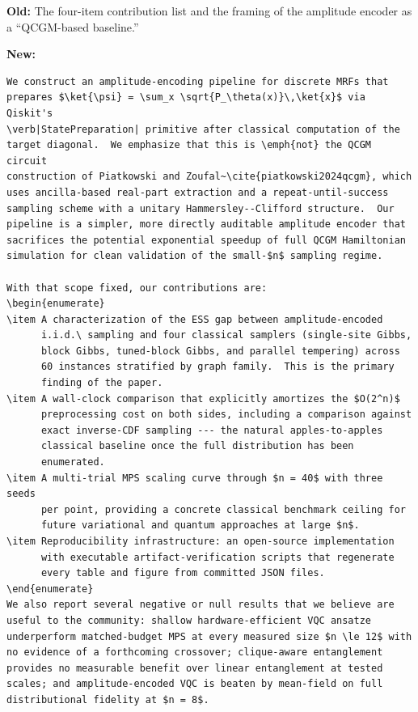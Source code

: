 \textbf{Old:} The four-item contribution list and the framing of the
amplitude encoder as a ``QCGM-based baseline.''

\noindent\textbf{New:}

\begin{verbatim}
We construct an amplitude-encoding pipeline for discrete MRFs that
prepares $\ket{\psi} = \sum_x \sqrt{P_\theta(x)}\,\ket{x}$ via Qiskit's
\verb|StatePreparation| primitive after classical computation of the
target diagonal.  We emphasize that this is \emph{not} the QCGM circuit
construction of Piatkowski and Zoufal~\cite{piatkowski2024qcgm}, which
uses ancilla-based real-part extraction and a repeat-until-success
sampling scheme with a unitary Hammersley--Clifford structure.  Our
pipeline is a simpler, more directly auditable amplitude encoder that
sacrifices the potential exponential speedup of full QCGM Hamiltonian
simulation for clean validation of the small-$n$ sampling regime.

With that scope fixed, our contributions are:
\begin{enumerate}
\item A characterization of the ESS gap between amplitude-encoded
      i.i.d.\ sampling and four classical samplers (single-site Gibbs,
      block Gibbs, tuned-block Gibbs, and parallel tempering) across
      60 instances stratified by graph family.  This is the primary
      finding of the paper.
\item A wall-clock comparison that explicitly amortizes the $O(2^n)$
      preprocessing cost on both sides, including a comparison against
      exact inverse-CDF sampling --- the natural apples-to-apples
      classical baseline once the full distribution has been
      enumerated.
\item A multi-trial MPS scaling curve through $n = 40$ with three seeds
      per point, providing a concrete classical benchmark ceiling for
      future variational and quantum approaches at large $n$.
\item Reproducibility infrastructure: an open-source implementation
      with executable artifact-verification scripts that regenerate
      every table and figure from committed JSON files.
\end{enumerate}
We also report several negative or null results that we believe are
useful to the community: shallow hardware-efficient VQC ansatze
underperform matched-budget MPS at every measured size $n \le 12$ with
no evidence of a forthcoming crossover; clique-aware entanglement
provides no measurable benefit over linear entanglement at tested
scales; and amplitude-encoded VQC is beaten by mean-field on full
distributional fidelity at $n = 8$.
\end{verbatim}

